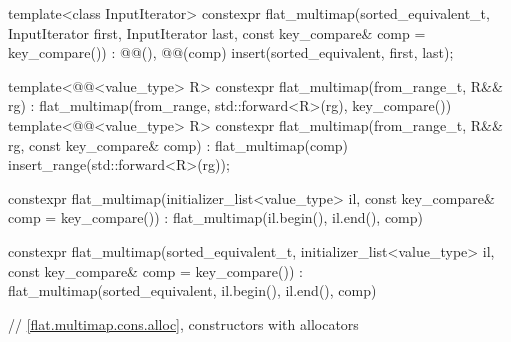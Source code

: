 \begin{codeblock}
{{    template<class InputIterator>
      constexpr flat_multimap(sorted_equivalent_t, InputIterator first, InputIterator last,
                              const key_compare& comp = key_compare())
        : @@(), @@(comp) { insert(sorted_equivalent, first, last); }

    template<@@<value_type> R>
      constexpr flat_multimap(from_range_t, R&& rg)
        : flat_multimap(from_range, std::forward<R>(rg), key_compare()) { }
    template<@@<value_type> R>
      constexpr flat_multimap(from_range_t, R&& rg, const key_compare& comp)
        : flat_multimap(comp) { insert_range(std::forward<R>(rg)); }

    constexpr flat_multimap(initializer_list<value_type> il,
                            const key_compare& comp = key_compare())
        : flat_multimap(il.begin(), il.end(), comp) { }

    constexpr flat_multimap(sorted_equivalent_t, initializer_list<value_type> il,
                            const key_compare& comp = key_compare())
        : flat_multimap(sorted_equivalent, il.begin(), il.end(), comp) { }

    // \ref{flat.multimap.cons.alloc}, constructors with allocators

}}
\end{codeblock}
